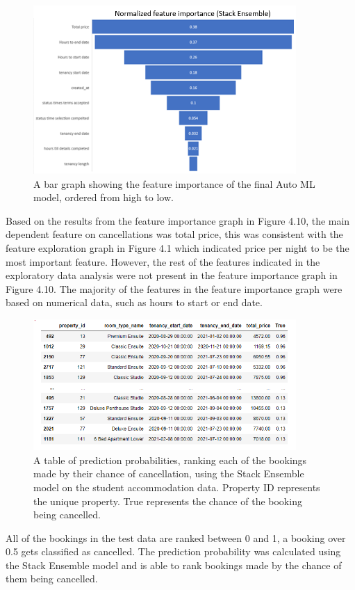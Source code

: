 \begin{figure}[H]
 \centering
 \includegraphics[width=10cm]{figures/feature_importance.png}
 \caption{A bar graph showing the feature importance of the final Auto ML model, ordered from high to low. }
\end{figure}

Based on the results from the feature importance graph in Figure 4.10, the main dependent feature on cancellations was total price, this was consistent with the feature exploration graph in Figure 4.1 which indicated price per night to be the most important feature. However, the rest of the features indicated in the exploratory data analysis were not present in the feature importance graph in Figure 4.10. The majority of the features in the feature importance graph were based on numerical data, such as hours to start or end date. 


\begin{figure}[H]
 \centering
 \includegraphics[width=10cm]{figures/canc_prob.png}
 \caption{A table of prediction probabilities, ranking each of the bookings made by their chance of cancellation, using the Stack Ensemble model on the student accommodation data. Property ID represents the unique property. True represents the chance of the booking being cancelled.}
\end{figure}
All of the bookings in the test data are ranked between 0 and 1, a booking over 0.5 gets classified as cancelled. The prediction probability was calculated using the Stack Ensemble model and is able to rank bookings made by the chance of them being cancelled.



